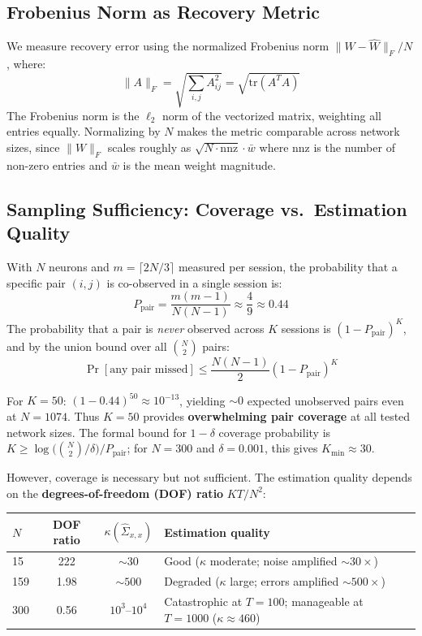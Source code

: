 \documentclass{article}
\begin{document}
\subsection{Frobenius Norm as Recovery Metric}
\label{sec:app_frobenius}

We measure recovery error using the normalized Frobenius norm $\|W - \hat{W}\|_F / N$, where:
\[
\|A\|_F = \sqrt{\sum_{i,j} A_{ij}^2} = \sqrt{\text{tr}(A^T A)}
\]
The Frobenius norm is the $\ell_2$ norm of the vectorized matrix, weighting all entries equally.
Normalizing by $N$ makes the metric comparable across network sizes, since $\|W\|_F$ scales roughly as $\sqrt{N \cdot \text{nnz}} \cdot \bar{w}$ where $\text{nnz}$ is the number of non-zero entries and $\bar{w}$ is the mean weight magnitude.

\subsection{Sampling Sufficiency: Coverage vs.\ Estimation Quality}
\label{sec:app_sampling}

With $N$ neurons and $m = \lceil 2N/3 \rceil$ measured per session, the probability that a specific pair $(i,j)$ is co-observed in a single session is:
\begin{equation}
    P_{\text{pair}} = \frac{m(m-1)}{N(N-1)} \approx \frac{4}{9} \approx 0.44
\end{equation}
The probability that a pair is \emph{never} observed across $K$ sessions is $(1 - P_{\text{pair}})^K$, and by the union bound over all $\binom{N}{2}$ pairs:
\begin{equation}
    \Pr[\text{any pair missed}] \leq \frac{N(N-1)}{2}(1 - P_{\text{pair}})^K
\end{equation}

For $K=50$: $(1 - 0.44)^{50} \approx 10^{-13}$, yielding $\sim 0$ expected unobserved pairs even at $N=1074$.
Thus $K=50$ provides \textbf{overwhelming pair coverage} at all tested network sizes.
The formal bound for $1-\delta$ coverage probability is $K \geq \log\bigl(\binom{N}{2}/\delta\bigr) / P_{\text{pair}}$; for $N=300$ and $\delta = 0.001$, this gives $K_{\min} \approx 30$.

However, coverage is necessary but not sufficient.
The estimation quality depends on the \textbf{degrees-of-freedom (DOF) ratio} $K T / N^2$:

\begin{center}
\renewcommand{\arraystretch}{1.2}
\begin{tabular}{lccl}
    \toprule
    $N$ & DOF ratio & $\kappa(\hat{\Sigma}_{x,x})$ & Estimation quality \\
    \midrule
    15  & 222    & $\sim 30$  & Good ($\kappa$ moderate; noise amplified $\sim\!30\times$) \\
    159 & 1.98   & $\sim 500$ & Degraded ($\kappa$ large; errors amplified $\sim\!500\times$) \\
    300 & 0.56   & $10^3$--$10^4$ & Catastrophic at $T{=}100$; manageable at $T{=}1000$ ($\kappa{\approx}460$) \\
    \bottomrule
\end{tabular}
\end{center}
\end{document}
